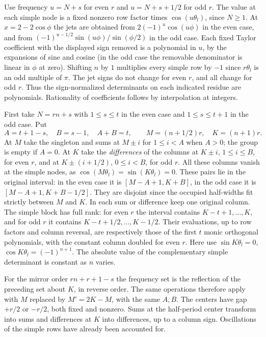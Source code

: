 \documentclass[11pt,a4paper]{article}
\begin{document}
Use frequency $u=N+s$ for even $r$ and $u=N+s+1/2$ for odd $r$. The value at each simple node is a fixed nonzero row factor times $\cos(u\theta_l)$, since $N\ge1$. At $x=2-2\cos\phi$ the jets are obtained from $2(-1)^u\cos(u\phi)$ in the even case, and from $(-1)^{u-1/2}\sin(u\phi)/\sin(\phi/2)$ in the odd case. Each fixed Taylor coefficient with the displayed sign removed is a polynomial in $u$, by the expansions of sine and cosine (in the odd case the removable denominator is linear in $\phi$ at zero). Shifting $n$ by $1$ multiplies every simple row by $-1$ since $r\theta_l$ is an odd multiple of $\pi$. The jet signs do not change for even $r$, and all change for odd $r$. Thus the sign-normalized determinants on each indicated residue are polynomials. Rationality of coefficients follows by interpolation at integers.

First take $N=rn+s$ with $1\le s\le t$ in the even case and $1\le s\le t+1$ in the odd case. Put
\[
 A=t+1-s,\quad B=s-1,\quad A+B=t,\qquad
 M=(n+1/2)r,\quad K=(n+1)r.
\]
At $M$ take the singleton and sums at $M\pm i$ for $1\le i<A$ when $A>0$; the group is empty if $A=0$. At $K$ take the \emph{differences} of the columns at $K\pm i$, $1\le i\le B$, for even $r$, and at $K\pm(i+1/2)$, $0\le i<B$, for odd $r$. All these columns vanish at the simple nodes, as $\cos(M\theta_l)=\sin(K\theta_l)=0$. These pairs lie in the original interval: in the even case it is $[M-A+1,K+B]$, in the odd case it is $[M-A+1,K+B-1/2]$. They are disjoint since the occupied half-widths fit strictly between $M$ and $K$. In each sum or difference keep one original column. The simple block has full rank: for even $r$ the interval contains $K-t+1,\ldots,K$, and for odd $r$ it contains $K-t+1/2,\ldots,K-1/2$. Their evaluations, up to row factors and column reversal, are respectively those of the first $t$ monic orthogonal polynomials, with the constant column doubled for even $r$. Here use $\sin K\theta_l=0$, $\cos K\theta_l=(-1)^{n+1}$. The absolute value of the complementary simple determinant is constant as $n$ varies.

For the mirror order $rn+r+1-s$ the frequency set is the reflection of the preceding set about $K$, in reverse order. The same operations therefore apply with $M$ replaced by $M'=2K-M$, with the same $A,B$. The centers have gap $+r/2$ or $-r/2$, both fixed and nonzero. Sums at the half-period center transform into sums and differences at $K$ into differences, up to a column sign. Oscillations of the simple rows have already been accounted for.
\end{document}
